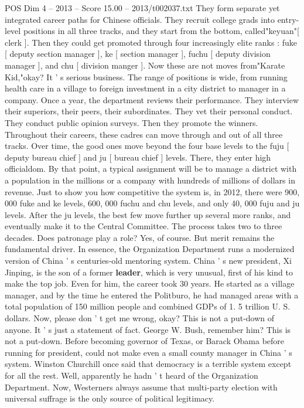 \begin{textsample}{POS Dim 4 – 2013 – Score 15.00 – 2013/t002037.txt}
They form separate yet integrated career paths for Chinese officials.
They recruit college grads into entry-level positions in all three tracks, and they start from the bottom, called"keyuan"[ clerk ].
Then they could get promoted through four increasingly elite ranks : fuke [ deputy section manager ], ke [ section manager ], fuchu [ deputy division manager ], and chu [ division manger ].
Now these are not moves from"Karate Kid,"okay?
It ' s serious business.
The range of positions is wide, from running health care in a village to foreign investment in a city district to manager in a company.
Once a year, the department reviews their performance.
They interview their superiors, their peers, their subordinates.
They vet their personal conduct.
They conduct public opinion surveys.
Then they promote the winners.
Throughout their careers, these cadres can move through and out of all three tracks.
Over time, the good ones move beyond the four base levels to the fuju [ deputy bureau chief ] and ju [ bureau chief ] levels.
There, they enter high officialdom.
By that point, a typical assignment will be to manage a district with a population in the millions or a company with hundreds of millions of dollars in revenue.
Just to show you how competitive the system is, in 2012, there were 900, 000 fuke and ke levels, 600, 000 fuchu and chu levels, and only 40, 000 fuju and ju levels.
After the ju levels, the best few move further up several more ranks, and eventually make it to the Central Committee.
The process takes two to three decades.
Does patronage play a role?
Yes, of course.
But merit remains the fundamental driver.
In essence, the Organization Department runs a modernized version of China ' s centuries-old mentoring system.
China ' s new president, Xi Jinping, is the son of a former \textbf{leader}, which is very unusual, first of his kind to make the top job.
Even for him, the career took 30 years.
He started as a village manager, and by the time he entered the Politburo, he had managed areas with a total population of 150 million people and combined GDPs of 1. 5 trillion U.
S. dollars.
Now, please don ' t get me wrong, okay?
This is not a put-down of anyone.
It ' s just a statement of fact.
George W.
Bush, remember him?
This is not a put-down.
Before becoming governor of Texas, or Barack Obama before running for president, could not make even a small county manager in China ' s system.
Winston Churchill once said that democracy is a terrible system except for all the rest.
Well, apparently he hadn ' t heard of the Organization Department.
Now, Westerners always assume that multi-party election with universal suffrage is the only source of political legitimacy.

\end{textsample}
